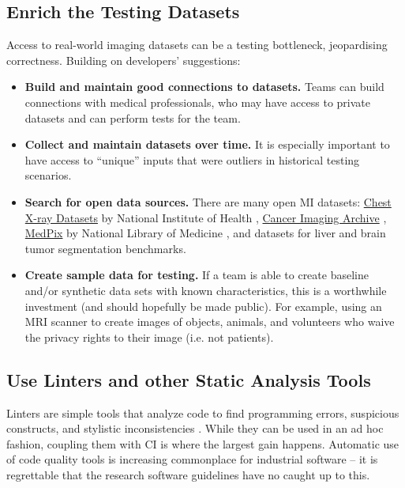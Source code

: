 \documentclass[draft, 12pt, 3p, times]{elsarticle} %
\begin{document}
\subsection{Enrich the Testing Datasets} \label{sec_recommendations_testing_dataset}

Access to real-world imaging datasets can be a testing bottleneck,
jeopardising correctness. Building on developers' suggestions:

\begin{itemize}
\item \textbf{Build and maintain good connections to datasets.} 
Teams can build
connections with medical professionals, who may have
access to private datasets and can perform tests for the team.

\item \textbf{Collect and maintain datasets over time.} It is especially
important to have access to ``unique'' inputs that were outliers in
historical testing scenarios.

\item \textbf{Search for open data sources.} There are many open MI
datasets:
\href{https://nihcc.app.box.com/v/ChestXray-NIHCC}{Chest X-ray Datasets} by
National Institute of Health \cite{WangEtAl2017},
\href{https://www.cancerimagingarchive.net/}{Cancer Imaging Archive}
\cite{PriorEtAl2017}, \href{https://medpix.nlm.nih.gov/home}{MedPix} by
National Library of Medicine \cite{Smirniotopoulos2014}, and datasets for liver
\cite{BilicEtAl2019} and brain \cite{MenzeEtAl2015} tumor segmentation
benchmarks.

\item \textbf{Create sample data for testing.} If a team is able to create
baseline and/or synthetic data sets with known characteristics, this is a
worthwhile investment (and should hopefully be made public). For example, using
an MRI scanner to create images of objects, animals, and volunteers who waive
the privacy rights to their image (i.e. not patients).

\end{itemize}

\subsection{Use Linters and other Static Analysis Tools} \label{Sec_Linters}

Linters are simple tools that analyze code to find programming errors,
suspicious constructs, and stylistic inconsistencies \cite{Wikipedia2022_Lint}.
While they can be used in an ad hoc fashion, coupling them with CI is where
the largest gain happens. Automatic use of code quality tools is increasing
commonplace for industrial software -- it is regrettable that the
research software guidelines have no caught up to this.
\end{document}
